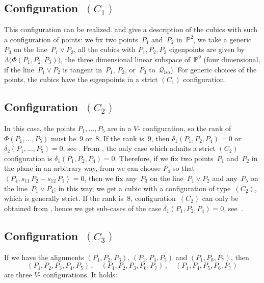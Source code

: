 \documentclass[a4paper, 11pt, reqno]{amsart}
\theoremstyle{plain}
\theoremstyle{definition}
\newcommand{\p}{\mathbb{P}}
\newcommand{\iso}{\mathcal{Q}_{\mathrm{iso}}}
\newcommand{\scl}[2]{\left\langle {#1}, {#2} \right\rangle}
\begin{document}
\subsection*{Configuration~\texorpdfstring{$(C_1)$}{C1}}
This configuration can be realized.  and 
give a description of the cubics with such a configuration of points:
we fix two points~$P_1$ and~$P_2$ in~$\p^2$, we take a generic~$P_3$
on the line~$P_1 \vee P_2$, all the cubics with
$P_1, P_2, P_3$ eigenpoints are given by $\Lambda \bigl( \Phi(P_1, P_2, P_3) \bigr)$, the three
dimensional linear subspace of~$\p^9$ (four dimensional, if the
line~$P_1 \vee P_2$ is tangent in~$P_1$, $P_2$, or~$P_3$ to~$\iso$). For generic choices of the points, the cubics have the eigenpoints in a strict
$(C_1)$ configuration.

\subsection*{Configuration~\texorpdfstring{$(C_2)$}{C2}}
In this case, the points
$P_1, \dots, P_5$ are in a
$V$- configuration, so the rank of~$\Phi(P_1, \dotsc, P_5)$
must be~$9$ or~$8$. If the rank is~$9$, then $\delta_1(P_1, P_2, P_4) = 0$
or $\delta_2(P_1, \dotsc, P_5) = 0$, see .
From , the only case
which admits a strict $(C_2)$ configuration
is $\delta_1(P_1, P_2, P_4) = 0$. Therefore, if we fix two points~$P_1$ and~$P_2$
in the plane in an arbitrary way, from  we can choose $P_4$ so that
$\scl{P_4}{s_{11}\, P_2 - s_{12} \, P_1}=0$, then we fix any~$P_3$
on the line~$P_1 \vee P_2$ and any~$P_5$ on the line~$P_1 \vee P_4$; in this way, we get a cubic with a configuration of type~$(C_2)$, which is generally strict. If the rank is~$8$, configuration~$(C_2)$ can only be obtained from , hence we get sub-cases of the case $\delta_1(P_1, P_2, P_4)=0$, see~.


\subsection*{Configuration~\texorpdfstring{$(C_3)$}{C3}}
If we have the alignments $(P_1, P_2, P_3)$, $(P_1, P_4, P_5)$ and $(P_1, P_6, P_7)$, then
%
\[
 (P_1, P_2, P_3, P_4, P_5) \,, \quad (P_1, P_2, P_3, P_6, P_7) \,, \quad (P_1, P_4, P_5, P_6, P_7)
\]
%
are three $V$- configurations. It holds:
\end{document}
